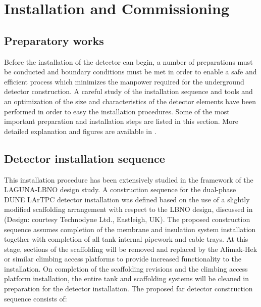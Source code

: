 \section{Installation and Commissioning}
\label{sec:detectors-fd-alt-install}

\subsection{Preparatory works}

Before the installation of the detector can begin, a number of preparations must be conducted and boundary conditions must be met  in
order to enable a safe and efficient process which minimizes the manpower required for the underground detector construction. A careful study of the installation sequence and tools and an optimization of the size and characteristics of the detector elements have been performed in order to easy the installation procedures. Some of the most important preparation and installation steps are listed in this section. More detailed explanation and figures are available in \anxlbnob. 

\subsection{Detector installation sequence}

This installation procedure has been extensively studied in the framework of the LAGUNA-LBNO design study. A construction sequence for the dual-phase
DUNE LArTPC detector installation was defined based on the use of a slightly modified scaffolding arrangement with respect to the LBNO
design, discussed in \anxlbnob  (Design: courtesy Technodyne Ltd., Eastleigh, UK). The proposed construction sequence assumes completion of the membrane and insulation system installation together with completion of all tank internal pipework and cable trays.  At this stage, sections of the
scaffolding will be removed and replaced by the Alimak-Hek or similar climbing access platforms to provide increased functionality to the
installation.  On completion of the scaffolding revisions and the climbing access platform installation, the entire tank and scaffolding
systems will be cleaned in preparation for the detector installation. The proposed far detector construction sequence consists of:

